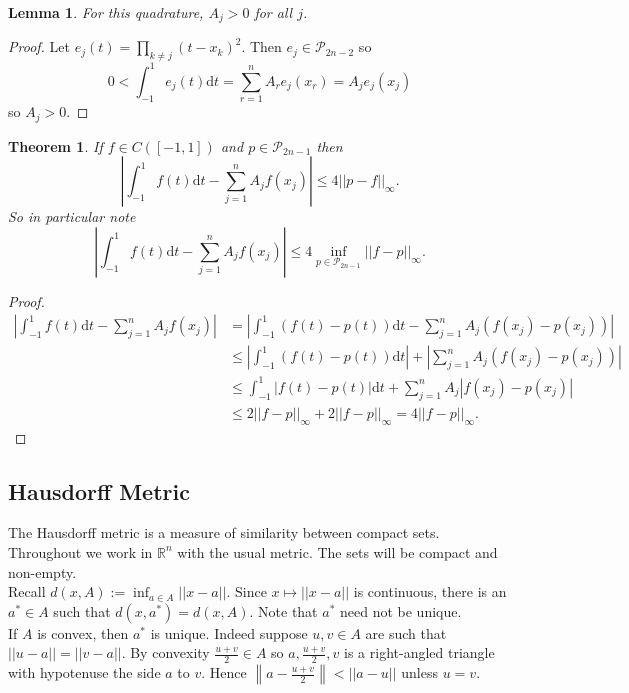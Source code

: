 \documentclass[a4paper, 10pt, twocolumn]{amsart}
\newtheorem*{theorem}{Theorem}
\newtheorem*{lemma}{Lemma}
\theoremstyle{definition}
\newcommand{\bb}[1]{\mathbb{#1}}
\renewcommand{\cal}[1]{\mathcal{#1}}
\newcommand{\1}{\mathbbm{1}}
\begin{document}
\begin{lemma}
    For this quadrature, $A_j>0$ for all $j$.
\end{lemma}

\begin{proof}
    Let $e_j(t) = \prod_{k\ne j} (t-x_k)^2$. Then $e_j \in \cal{P}_{2n-2}$ so \[0<\int_{-1}^1 e_j(t)\mathrm{d}t = \sum_{r=1}^n A_re_j(x_r) = A_je_j(x_j)\]
    so $A_j>0$.
\end{proof}

\begin{theorem}
    If $f \in C([-1,1])$ and $p \in \cal{P}_{2n-1}$ then \[\left| \int_{-1}^1 f(t)\mathrm{d}t - \sum_{j=1}^n A_jf(x_j)\right| \le 4||p-f||_\infty.\]
    So in particular note \[\left| \int_{-1}^1 f(t)\mathrm{d}t - \sum_{j=1}^n A_jf(x_j)\right| \le 4\inf_{p \in \cal{P}_{2n-1}} ||f-p||_\infty.\]
\end{theorem}

\begin{proof}
    \begin{align*}
        \left| \int_{-1}^1 f(t)\mathrm{d}t - \sum_{j=1}^n A_jf(x_j)\right| &= \left| \int_{-1}^1 (f(t)-p(t))\mathrm{d}t - \sum_{j=1}^n A_j(f(x_j)-p(x_j))\right|\\
        &\le \left|\int_{-1}^1 (f(t)-p(t))\mathrm{d}t \right| + \left|\sum_{j=1}^n A_j(f(x_j)-p(x_j)) \right|\\
        &\le \int_{-1}^1 |f(t)-p(t)|\mathrm{d}t + \sum_{j=1}^n A_j|f(x_j)-p(x_j)|\\
        &\le 2||f-p||_\infty + 2||f-p||_\infty = 4||f-p||_\infty.
    \end{align*}
\end{proof}

\subsection*{Hausdorff Metric}

The Hausdorff metric is a measure of similarity between compact sets. Throughout we work in $\bb{R}^n$ with the usual metric. The sets will be compact and non-empty.\\

Recall $d(x,A) := \inf_{a \in A}||x-a||$. Since $x\mapsto ||x-a||$ is continuous, there is an $a^* \in A$ such that $d(x,a^\ast) = d(x,A)$. Note that $a^\ast$ need not be unique.\\

If $A$ is convex, then $a^\ast$ is unique. Indeed suppose $u,v \in A$ are such that $||u-a|| = ||v-a||$. By convexity $\frac{u+v}{2}  \in A$ so $a,\frac{u+v}{2},v$ is a right-angled triangle with hypotenuse the side $a$ to $v$. Hence $\left\|a-\frac{u+v}{2}\right\| < ||a-u||$ unless $u=v$.
\end{document}
